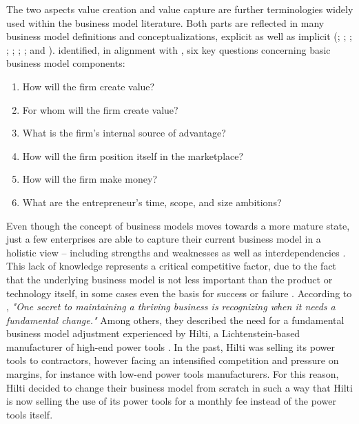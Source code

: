 The two aspects value creation and value capture are further terminologies widely used within the business model literature. Both parts are reflected in many business model definitions and conceptualizations, explicit as well as implicit (\citealp[p. 511]{Amit2001}; \citealp[pp. 533-534]{Chesbrough2002}; \citealp[p. 727]{Morris2005}; \citealp[p. 202]{Shafer2005}; \citealp[p. 12]{Chesbrough2007}; \citealp[p. 52]{Johnson2008}; \citealp[p. 14]{Osterwalder2010}; and \citealp[pp. 1019-1020]{Zott2011}). \citet[pp. 729-732]{Morris2005} identified, in alignment with \citet[pp. 49-61]{Drucker1954}, six key questions concerning basic business model components:

\begin{enumerate}[parsep=0pt, topsep=0pt, itemsep=0pt]
	\item How will the firm create value?
	\item For whom will the firm create value?
	\item What is the firm's internal source of advantage?
	\item How will the firm position itself in the marketplace?
	\item How will the firm make money?
	\item What are the entrepreneur's time, scope, and size ambitions?
\end{enumerate}

Even though the concept of business models moves towards a more mature state, just a few enterprises are able to capture their current business model in a holistic view -- including strengths and weaknesses as well as interdependencies \citep[p. 52]{Johnson2008}. This lack of knowledge represents a critical competitive factor, due to the fact that the underlying business model is not less important than the product or technology itself, in some cases even the basis for success or failure . According to \citet[p. 50]{Johnson2008}, \textit{"One secret to maintaining a thriving business is recognizing when it needs a fundamental change."} Among others, they described the need for a fundamental business model adjustment experienced by Hilti, a Lichtenstein-based manufacturer of high-end power tools \citep[pp. 54-57]{Johnson2008}. In the past, Hilti was selling its power tools to contractors, however facing an intensified competition and pressure on margins, for instance with low-end power tools manufacturers. For this reason, Hilti decided to change their business model from scratch in such a way that Hilti is now selling the use of its power tools for a monthly fee instead of the power tools itself.

